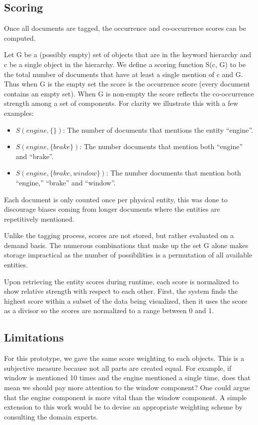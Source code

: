 \subsection{Scoring}
Once all documents are tagged, the occurrence and co-occurrence scores can be
computed. 

Let G be a (possibly empty) set of objects that are in the keyword hierarchy and
c be a single object in the hierarchy. We define a scoring function S(c, G) to be 
the total number of documents that have at least a single mention of c and G. Thus 
when G is the empty set the score is the occurrence score (every document 
contains an empty set). When G is non-empty the score reflects the co-occurrence 
strength among a set of components. For clarity we illustrate this with a few examples:
\begin{itemize} [noitemsep]
  \item $S(engine, \{\})$: The number of documents that mentions the entity
  ``engine''.
  
  
  \item $S(engine, \{brake\})$: The number documents that mention both
  ``engine'' and ``brake''. 
  
  \item $S(engine, \{brake, window\})$: The number documents that mention both
  ``engine,'' ``brake'' and ``window''. 
\end{itemize}

Each document is only counted once per physical entity, this was done to
discourage biases coming from longer documents where the entities are
repetitively mentioned.

Unlike the tagging process, scores are not stored, but rather
evaluated on a demand basis. The numerous combinations that make up the set G
alone makes storage impractical as the number of possibilities is a permutation
of all available entities.
 
Upon retrieving the entity scores during runtime, each score is normalized
to show relative strength with respect to each other. First, the system finds
the highest score within a subset of the data being visualized, then it uses the
score as a divisor so the scores are normalized to a range between 0 and 1.

  
\subsection{Limitations} 
For this prototype, we gave the same score weighting to each objects. This is a 
subjective measure because not all parts are created equal. For example, if window 
is mentioned 10 times and the engine mentioned a single time, does that mean we 
should pay more attention to the window component? One could argue that the engine 
component is more vital than the window component. A simple extension to this
work would be to devise an appropriate weighting scheme by consulting the domain
experts. 

